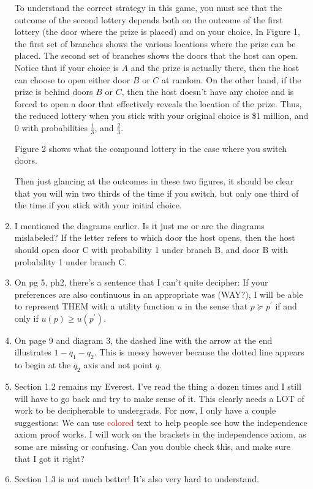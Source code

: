 \documentclass[12pt, fleqn]{article}
\begin{document}
\begin{enumerate}
To understand the correct strategy in this game, you must 
see that the outcome of the second lottery depends both on the outcome of
the first lottery (the door where the prize is placed) and on your choice. In
Figure 1, the first set of branches shows the various locations where the prize
can be placed. The second set of branches shows the doors that the host can
open. Notice that if your choice is $A$ and the prize is actually there, then
the host can choose to open either door $B$ or $C$ at random. On the
other hand, if the prize is behind doors $B$ or $C$, then the host doesn't
have any choice and is forced to open a door that effectively reveals the
location of the prize.  Thus, the reduced lottery when you stick with your original choice is \$1 million, and 0 with probabilities $\frac{1}{3}$, and $\frac{2}{3}$.

Figure 2 shows what the compound lottery in the case where you switch doors.

Then just glancing at the outcomes in these two figures, it should
be clear that you will win two thirds of the time if you switch, but only one
third of the time if you stick with your initial choice.

   \item I mentioned the diagrams earlier.  Is it just me or are the diagrams mislabeled?  If the letter refers to which door the host opens, then the host should open door C with probability 1 under branch B, and door B with probability 1 under branch C. 
   \item On pg 5, ph2, there's a sentence that I can't quite decipher: If your preferences are also continuous in an appropriate was (WAY?), I will be able to represent THEM with a utility function $u$ in the sense that $p\succeq p^{\prime}$ if and only if $u\left(  p\right) \geq u\left(  p^{\prime}\right)  $. 
   \item On page 9 and diagram 3, the dashed line with the arrow at the end illustrates $1-q_{1}-q_{2}$.  This is messy however because the dotted line appears to begin at the $q_{2}$ axis and not point $q$.  
   \item Section 1.2 remains my Everest.  I've read the thing a dozen times and I still will have to go back and try to make sense of it.  This clearly needs a LOT of work to be decipherable to undergrads.  For now, I only have a couple suggestions:
     \subitem We can use \textcolor{red}{colored} text to help people see how the independence axiom proof works. 
     \subitem I will work on the brackets in the independence axiom, as some are missing or confusing.  Can you double check this, and make sure that I got it right?   
   \item Section 1.3 is not much better!  It's also very hard to understand.  
\end{enumerate}
\end{document}
